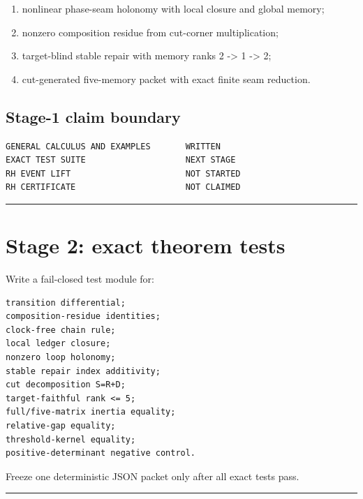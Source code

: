 \begin{enumerate}
\def\labelenumi{\arabic{enumi}.}
\tightlist
\item
  nonlinear phase-seam holonomy with local closure and global memory;
\item
  nonzero composition residue from cut-corner multiplication;
\item
  target-blind stable repair with memory ranks 2 -\textgreater{} 1 -\textgreater{} 2;
\item
  cut-generated five-memory packet with exact finite seam reduction.
\end{enumerate}

\hypertarget{stage-1-claim-boundary}{%
\subsection{Stage-1 claim boundary}\label{stage-1-claim-boundary}}

\begin{verbatim}
GENERAL CALCULUS AND EXAMPLES       WRITTEN
EXACT TEST SUITE                    NEXT STAGE
RH EVENT LIFT                       NOT STARTED
RH CERTIFICATE                      NOT CLAIMED
\end{verbatim}

\begin{center}\rule{0.5\linewidth}{0.5pt}\end{center}

\hypertarget{stage-2-exact-theorem-tests}{%
\section{Stage 2: exact theorem tests}\label{stage-2-exact-theorem-tests}}

Write a fail-closed test module for:

\begin{verbatim}
transition differential;
composition-residue identities;
clock-free chain rule;
local ledger closure;
nonzero loop holonomy;
stable repair index additivity;
cut decomposition S=R+D;
target-faithful rank <= 5;
full/five-matrix inertia equality;
relative-gap equality;
threshold-kernel equality;
positive-determinant negative control.
\end{verbatim}

Freeze one deterministic JSON packet only after all exact tests pass.

\begin{center}\rule{0.5\linewidth}{0.5pt}\end{center}

